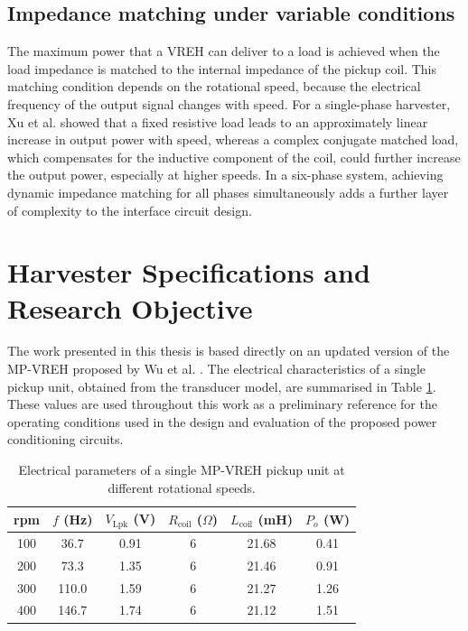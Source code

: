 \subsection*{Impedance matching under variable conditions}
The maximum power that a VREH can deliver to a load
is achieved when the load impedance is matched to the
internal impedance of the pickup coil. This matching
condition depends on the rotational speed, because the
electrical frequency of the output signal changes with
speed. For a single-phase harvester, Xu et
al. \cite{xuDesignModelingOptimization2019a} showed that a fixed
resistive load leads to an approximately linear increase
in output power with speed, whereas a complex conjugate
matched load, which compensates for the inductive
component of the coil, could further increase the
output power, especially at higher speeds. In a six-phase
system, achieving dynamic impedance matching for all
phases simultaneously adds a further layer of complexity
to the interface circuit design.

\section{Harvester Specifications and Research Objective}
\label{sec:mpvreh_specs}

The work presented in this thesis is based directly on an updated version of
the MP-VREH proposed by Wu et al. \cite{wuMultiPhaseVariableReluctance2024}.
The electrical characteristics of a single pickup unit,
obtained from the transducer model, are summarised in
Table \ref{tab:vreh_par}. These values are used
throughout this work as a preliminary reference for the operating
conditions used in the design and evaluation of the proposed
power conditioning circuits.

\begin{table}[htbp]
    \centering

    \begin{tabular}{cccccc}
        \toprule
        rpm & $f$ (Hz) & $V_\text{Lpk}$ (V) & $R_\text{coil}$ ($\Omega$) &$L_\text{coil}$ (mH) & $P_o$ (W) \\
        \midrule
        100 & 36.7  & 0.91 & 6 & 21.68 & 0.41 \\
        200 & 73.3  & 1.35 & 6 & 21.46 & 0.91 \\
        300 & 110.0 & 1.59 & 6 & 21.27 & 1.26 \\
        400 & 146.7 & 1.74 & 6 & 21.12 & 1.51 \\
        \bottomrule
    \end{tabular}
    \caption{Electrical parameters of a single MP-VREH
             pickup unit at different rotational speeds.}
    \label{tab:vreh_par}
\end{table}

